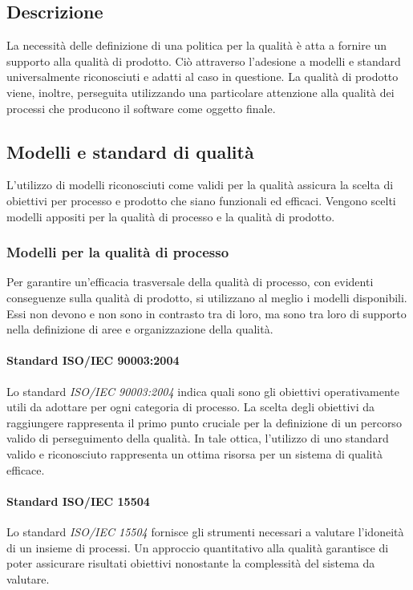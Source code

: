 \documentclass[12pt,a4paper]{article}
\begin{document}
\subsection{Descrizione}
La necessità delle definizione di una politica per la qualità è atta a fornire un supporto alla qualità di prodotto. Ciò attraverso l'adesione a modelli e standard universalmente riconosciuti e adatti al caso in questione. La qualità di prodotto viene, inoltre, perseguita utilizzando una particolare attenzione alla qualità dei processi che producono il software come oggetto finale.

\subsection{Modelli e standard di qualità}
L'utilizzo di modelli riconosciuti come validi per la qualità assicura la scelta di obiettivi per processo e prodotto che siano funzionali ed efficaci. Vengono scelti modelli appositi per la qualità di processo e la qualità di prodotto.

\subsubsection{Modelli per la qualità di processo}
Per garantire un'efficacia trasversale della qualità di processo, con evidenti conseguenze sulla qualità di prodotto, si utilizzano al meglio i modelli disponibili. Essi non devono e non sono  in contrasto tra di loro, ma sono tra loro di supporto nella definizione di aree e organizzazione della qualità.

\paragraph{Standard ISO/IEC 90003:2004}
Lo standard \textit{ISO/IEC 90003:2004} indica quali sono gli obiettivi operativamente utili da adottare per ogni categoria di processo. La scelta degli obiettivi da raggiungere rappresenta il primo punto cruciale per la definizione di un percorso valido di perseguimento della qualità. In tale ottica, l'utilizzo di uno standard valido e riconosciuto rappresenta un ottima risorsa per un sistema di qualità efficace.

\paragraph{Standard ISO/IEC 15504}
Lo standard \textit{ISO/IEC 15504} fornisce gli strumenti necessari a valutare l'idoneità di un insieme di processi. Un approccio quantitativo alla qualità garantisce di poter assicurare risultati obiettivi nonostante la complessità del sistema da valutare.
\end{document}
